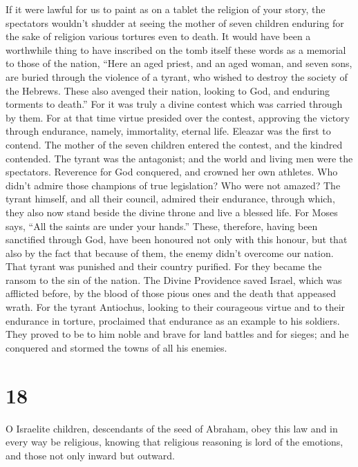  If it were lawful for us to paint as on a tablet the
religion of your story, the spectators wouldn't shudder at seeing the
mother of seven children enduring for the sake of religion various
tortures even to death.  It would have been a worthwhile
thing to have inscribed on the tomb itself these words as a memorial to
those of the nation,  ``Here an aged priest, and an aged
woman, and seven sons, are buried through the violence of a tyrant, who
wished to destroy the society of the Hebrews.  These also
avenged their nation, looking to God, and enduring torments to death.''
 For it was truly a divine contest which was carried
through by them.  For at that time virtue presided over the
contest, approving the victory through endurance, namely, immortality,
eternal life.  Eleazar was the first to contend. The mother
of the seven children entered the contest, and the kindred contended.
 The tyrant was the antagonist; and the world and living
men were the spectators.  Reverence for God conquered, and
crowned her own athletes.  Who didn't admire those
champions of true legislation? Who were not amazed?  The
tyrant himself, and all their council, admired their endurance,
 through which, they also now stand beside the divine
throne and live a blessed life.  For Moses says, ``All the
saints are under your hands.''  These, therefore, having
been sanctified through God, have been honoured not only with this
honour, but that also by the fact that because of them, the enemy didn't
overcome our nation.  That tyrant was punished and their
country purified.  For they became the ransom to the sin of
the nation. The Divine Providence saved Israel, which was afflicted
before, by the blood of those pious ones and the death that appeased
wrath.  For the tyrant Antiochus, looking to their
courageous virtue and to their endurance in torture, proclaimed that
endurance as an example to his soldiers.  They proved to be
to him noble and brave for land battles and for sieges; and he conquered
and stormed the towns of all his enemies.

\hypertarget{section-17}{%
\section{18}\label{section-17}}

 O Israelite children, descendants of the seed of Abraham,
obey this law and in every way be religious,  knowing that
religious reasoning is lord of the emotions, and those not only inward
but outward.

